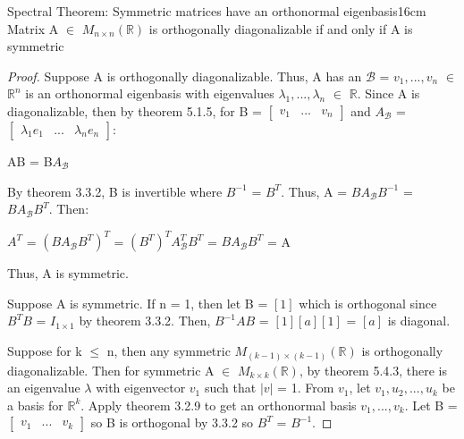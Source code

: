     \vspace{0.5cm}



    \begin{wtheorem}{Spectral Theorem: Symmetric matrices have an
    orthonormal eigenbasis}{16cm}
        Matrix A $\in$ $M_{n \times n}(\mathbb{R})$ is orthogonally
        diagonalizable if and only if A is symmetric
    \end{wtheorem}

    \begin{proof}
        Suppose A is orthogonally diagonalizable.
        Thus, A has an $\mathcal{B}$ = $v_1,...,v_n$ $\in$ $\mathbb{R}^n$
        is an orthonormal eigenbasis with eigenvalues $\lambda_1,...,\lambda_n$
        $\in$ $\mathbb{R}$.
        Since A is diagonalizable, then by {\color{red} theorem 5.1.5},
        for B =
        $\begin{bmatrix}
            v_1 & ... & v_n
        \end{bmatrix}$ and $A_{\mathcal{B}}$ =
        $\begin{bmatrix}
            \lambda_1e_1 & ... & \lambda_ne_n
        \end{bmatrix}$:

        \hspace{0.5cm}
        AB = B$A_{\mathcal{B}}$

        By {\color{red} theorem 3.3.2}, B is invertible where $B^{-1}$ = $B^T$.
        Thus, A = $BA_{\mathcal{B}}B^{-1}$ = $BA_{\mathcal{B}}B^T$. Then:

        \hspace{0.5cm}
        $A^T$
        = $(BA_{\mathcal{B}}B^T)^T$
        = $(B^T)^T A_{\mathcal{B}}^T B^T$
        = $B A_{\mathcal{B}} B^T$
        = A

        Thus, A is symmetric.

        \vspace{0.3cm}

        Suppose A is symmetric.
        If n = 1, then let B = $[1]$ which is orthogonal since
        $B^TB$ = $I_{1 \times 1}$ by {\color{red} theorem 3.3.2}.
        Then, $B^{-1}AB$ = $[1][a][1]$ = $[a]$ is diagonal.

        Suppose for k $\leq$ n, then any symmetric
        $M_{(k-1) \times (k-1)}(\mathbb{R})$ is orthogonally diagonalizable.
        Then for symmetric A $\in$ $M_{k \times k}(\mathbb{R})$,
        by {\color{red} theorem 5.4.3}, there is an eigenvalue $\lambda$
        with eigenvector $v_1$ such that $|v|$ = 1.
        From $v_1$, let $v_1,u_2,...,u_k$ be a basis for $\mathbb{R}^k$.
        Apply {\color{red} theorem 3.2.9} to get an orthonormal basis
        $v_1,...,v_k$. Let B =
        $\begin{bmatrix}
            v_1 & ... & v_k
        \end{bmatrix}$ so B is orthogonal by {\color{red} 3.3.2}
        so $B^T$ = $B^{-1}$.
        

\end{proof}
